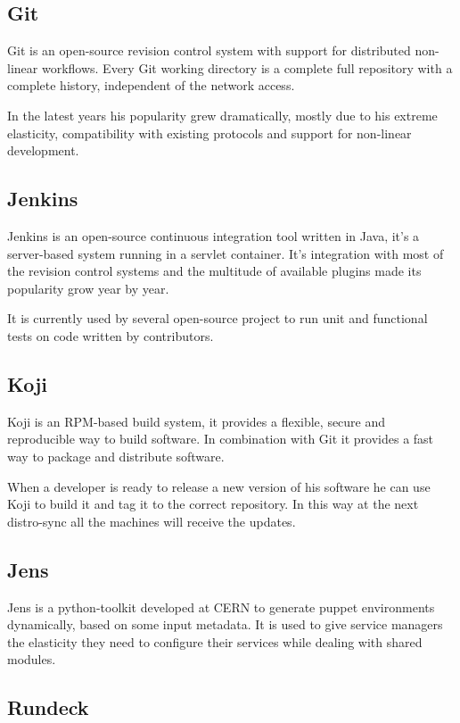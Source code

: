 \subsection{Git}

Git is an open-source revision control system with support for distributed
non-linear workflows. Every Git working directory is a complete full
repository with a complete history, independent of the network access.

In the latest years his popularity grew dramatically, mostly due to his
extreme elasticity, compatibility with existing protocols and support for
non-linear development.

\subsection{Jenkins}

Jenkins is an open-source continuous integration tool written in Java,
it's a server-based system running in a servlet container. It's
integration with most of the revision control systems and the multitude of
available plugins made its popularity grow year by year.

It is currently used by several open-source project to run unit and
functional tests on code written by contributors.

\subsection{Koji}

Koji is an RPM-based build system, it provides a flexible, secure and
reproducible way to build software. In combination with Git it provides
a fast way to package and distribute software.

When a developer is ready to release a new version of his software he can
use Koji to build it and tag it to the correct repository. In this way at
the next distro-sync all the machines will receive the updates.

\subsection{Jens}

Jens is a python-toolkit developed at CERN to generate puppet environments
dynamically, based on some input metadata. It is used to give service
managers the elasticity they need to configure their services while
dealing with shared modules.

\subsection{Rundeck}

